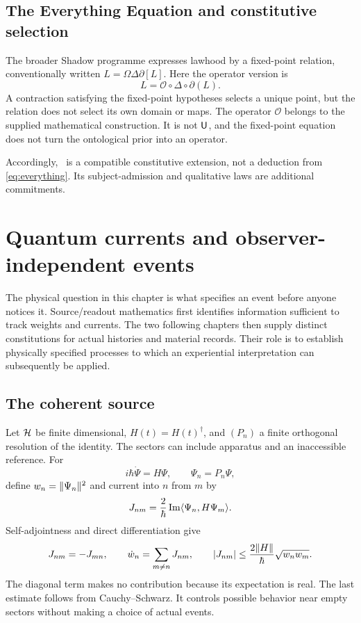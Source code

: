 \section{The Everything Equation and constitutive selection}\label{section:source:the-everything-equation-and-constitutive-selection}
The broader Shadow programme expresses lawhood by a fixed-point relation, conventionally written $L=\Omega\Delta\partial[L]$. Here the operator version is
\begin{equation}\label{eq:everything}
L=\mathcal O\circ\Delta\circ\partial(L).
\end{equation}
A contraction satisfying the fixed-point hypotheses selects a unique point, but the relation does not select its own domain or maps. The operator $\mathcal O$ belongs to the supplied mathematical construction. It is not $\mathsf{U}$, and the fixed-point equation does not turn the ontological prior into an operator.

Accordingly, \spctwo\ is a compatible constitutive extension, not a deduction from \cref{eq:everything}. Its subject-admission and qualitative laws are additional commitments.

\chapter{Quantum currents and observer-independent events}\label{ch:quantum}
The physical question in this chapter is what specifies an event before anyone notices it. Source/readout mathematics first identifies information sufficient to track weights and currents. The two following chapters then supply distinct constitutions for actual histories and material records. Their role is to establish physically specified processes to which an experiential interpretation can subsequently be applied.

\section{The coherent source}\label{section:quantum:the-coherent-source}
Let $\mathcal H$ be finite dimensional, $H(t)=H(t)^\dagger$, and $(P_n)$ a finite orthogonal resolution of the identity. The sectors can include apparatus and an inaccessible reference. For
\[
i\hbar\dot\Psi=H\Psi,\qquad \Psi_n=P_n\Psi,
\]
define $w_n=\lVert \Psi_n\rVert^2$ and current into $n$ from $m$ by
\begin{equation}\label{eq:current}
J_{nm}=\frac{2}{\hbar}\operatorname{Im}\langle \Psi_n,H\Psi_m\rangle.
\end{equation}
Self-adjointness and direct differentiation give
\begin{equation}\label{eq:continuity}
J_{nm}=-J_{mn},\qquad
\dot w_n=\sum_{m\ne n}J_{nm},\qquad
|J_{nm}|\le\frac{2\lVert H\rVert}{\hbar}\sqrt{w_nw_m}.
\end{equation}
The diagonal term makes no contribution because its expectation is real. The last estimate follows from Cauchy--Schwarz. It controls possible behavior near empty sectors without making a choice of actual events.

